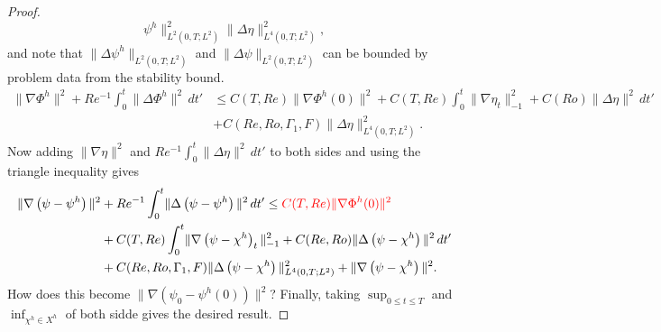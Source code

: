 \begin{proof}
\begin{equation}
      \psi^h\|^2_{L^2(0,T;L^2)} \|\Delta \eta\|^2_{L^4(0,T;L^2)},
    \label{eqn:HolderPsih}
  \end{equation}
  and note that $\|\Delta \psi^h\|_{L^2(0,T;L^2)}$ and $\|\Delta
  \psi\|_{L^2(0,T;L^2)}$ can be bounded by problem data from the stability
  bound.
  \begin{align*}
    \|\nabla \Phi^h\|^2 + Re^{-1} \int_0^t\! \|\Delta \Phi^h\|^2\, dt'
      & \le C(T,Re) \|\nabla \Phi^h(0)\|^2
      + C(T,Re) \int_0^t\! \|\nabla \eta_t\|_{-1}^2
      + C(Ro) \|\Delta \eta\|^2\, dt' \\
    & + C(Re,Ro,\Gamma_1,F) \|\Delta \eta\|^2_{L^4(0,T;L^2)}.
  \end{align*}
  Now adding $\|\nabla \eta\|^2$ and $Re^{-1} \int_0^t\! \|\Delta \eta\|^2\, dt'$ to
  both sides and using the triangle inequality gives
  \begin{align*}
    \|\nabla \left( \psi - \psi^h\right) \|^2
      &+ Re^{-1} \int_0^t\! \|\Delta \left(\psi - \psi^h\right)\|^2\, dt'
      \le {\color{red} C(T,Re) \|\nabla \Phi^h(0)\|^2} \\
    & + C(T,Re) \int_0^t\! \|\nabla \left( \psi - \chi^h\right)_t\|_{-1}^2
      + C(Re,Ro) \|\Delta \left(\psi - \chi^h\right)\|^2\, dt' \\
    & + C(Re,Ro,\Gamma_1,F) \|\Delta \left(\psi - \chi^h\right)\|^2_{L^4(0,T;L^2)}
      + \|\nabla \left(\psi - \chi^h\right)\|^2.
  \end{align*}
  {\color{red} How does this become $\|\nabla\left(\psi_0 -
  \psi^h(0)\right)\|^2$?}
  Finally, taking $\sup_{0\le t \le T}$ and $\inf_{\chi^h \in X^h}$ of both
  sidde gives the desired result.
\end{proof}

\begin{lemma} \label{lma:Interpolation}

\end{lemma}

